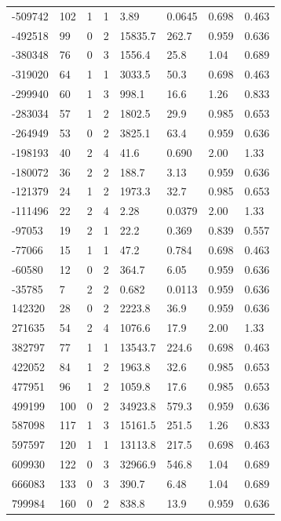 \documentclass[preview]{standalone}
\begin{document}
{{\begin{tabular}{L{1.2cm}C{1.2cm} C{0.3cm}C{0.5cm} C{1.4cm}C{1.4cm} C{1.4cm}C{1.4cm}}
  -509742  &   102  & 1     &  1 &  3.89  & 0.0645  & 0.698 &  0.463   \\ 
  -492518  &    99  & 0     &  2 &  15835.7  & 262.7  & 0.959 &  0.636   \\ 
  -380348  &    76  & 0     &  3 &  1556.4  & 25.8  & 1.04 &  0.689   \\ 
  -319020  &    64  & 1     &  1 &  3033.5  & 50.3  & 0.698 &  0.463   \\ 
  -299940  &    60  & 1     &  3 &  998.1  & 16.6  & 1.26 &  0.833   \\ 
  -283034  &    57  & 1     &  2 &  1802.5  & 29.9  & 0.985 &  0.653   \\ 
  -264949  &    53  & 0     &  2 &  3825.1  & 63.4  & 0.959 &  0.636   \\ 
  -198193  &    40  & 2     &  4 &  41.6  & 0.690  & 2.00 &  1.33   \\ 
  -180072  &    36  & 2     &  2 &  188.7  & 3.13  & 0.959 &  0.636   \\ 
  -121379  &    24  & 1     &  2 &  1973.3  & 32.7  & 0.985 &  0.653   \\ 
  -111496  &    22  & 2     &  4 &  2.28  & 0.0379  & 2.00 &  1.33   \\ 
  -97053  &    19  & 2     &  1 &  22.2  & 0.369  & 0.839 &  0.557   \\ 
  -77066  &    15  & 1     &  1 &  47.2  & 0.784  & 0.698 &  0.463   \\ 
  -60580  &    12  & 0     &  2 &  364.7  & 6.05  & 0.959 &  0.636   \\ 
  -35785  &     7  & 2     &  2 &  0.682  & 0.0113  & 0.959 &  0.636   \\ 
  142320  &    28  & 0     &  2 &  2223.8  & 36.9  & 0.959 &  0.636   \\ 
  271635  &    54  & 2     &  4 &  1076.6  & 17.9  & 2.00 &  1.33   \\ 
  382797  &    77  & 1     &  1 &  13543.7  & 224.6  & 0.698 &  0.463   \\ 
  422052  &    84  & 1     &  2 &  1963.8  & 32.6  & 0.985 &  0.653   \\ 
  477951  &    96  & 1     &  2 &  1059.8  & 17.6  & 0.985 &  0.653   \\ 
  499199  &   100  & 0     &  2 &  34923.8  & 579.3  & 0.959 &  0.636   \\ 
  587098  &   117  & 1     &  3 &  15161.5  & 251.5  & 1.26 &  0.833   \\ 
  597597  &   120  & 1     &  1 &  13113.8  & 217.5  & 0.698 &  0.463   \\ 
  609930  &   122  & 0     &  3 &  32966.9  & 546.8  & 1.04 &  0.689   \\ 
  666083  &   133  & 0     &  3 &  390.7  & 6.48  & 1.04 &  0.689   \\ 
  799984  &   160  & 0     &  2 &  838.8  & 13.9  & 0.959 &  0.636   \\ 
\hline 
\end{tabular} 

}}
\end{document}
